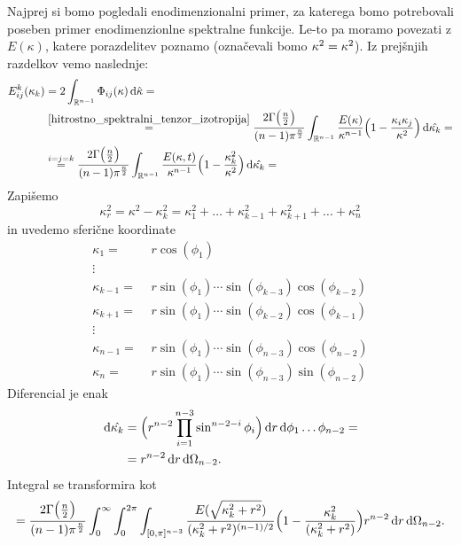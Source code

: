 \documentclass[mat2, tisk]{fmfdelo}
\newcommand{\R}{\mathbb R}
\newcommand{\bd}{\textbf}
\begin{document}
Najprej si bomo pogledali enodimenzionalni primer, za katerega bomo
potrebovali poseben primer enodimenzionlne spektralne funkcije. Le-to pa moramo 
povezati z $E(\kappa)$, katere porazdelitev poznamo (označevali bomo $\bd{\text{$\kappa$}}^2 = \kappa^2$). Iz prejšnjih razdelkov vemo 
naslednje: 
\begin{align*}
E_{ij}^k(\kappa_k) &= 2 \int_{\R^{n-1}}\Phi_{ij}(\bd{\text{$\kappa$}}) \dif \hat{\bd{\text{$\kappa$}}} = \\
&\stackrel{\ref{hitrostno_spektralni_tenzor_izotropija}}{=} \frac{2\Gamma\big(\frac{n}{2}\big)}{(n-1)\pi^\frac{n}{2}} \int_{\R^{n-1}} \frac{E(\kappa)}{\kappa^{n-1}}\Big(1 - \frac{\kappa_i \kappa_j}{\kappa^2}\Big)\dif \hat{\bd{\text{$\kappa_k$}}} = \\
&\stackrel{i=j=k}{=} \frac{2\Gamma\big(\frac{n}{2}\big)}{(n-1)\pi^\frac{n}{2}} \int_{\R^{n-1}} \frac{E(\kappa, t)}{\kappa^{n-1}}\Big(1 - \frac{\kappa_k^2}{\kappa^2}\Big)\dif \hat{\bd{\text{$\kappa_k$}}} = 
\end{align*}
Zapišemo 
$$
\kappa_r^2 = \kappa^2 - \kappa_k^2 = \kappa_1^2 + \dots + \kappa_{k-1}^2 + \kappa_{k+1}^2 + \dots + \kappa_n^2
$$
in uvedemo sferične koordinate 
\begin{align*}
\kappa_1 =& \,\,r\cos(\phi_1) \\
\vdots &\\
\kappa_{k-1} =& \,\,r\sin(\phi_{1}) \cdots \sin(\phi_{k-3}) \cos(\phi_{k-2})\\
\kappa_{k+1} =& \,\,r\sin(\phi_{1}) \cdots \sin(\phi_{k-2}) \cos(\phi_{k-1})\\
\vdots &\\
\kappa_{n-1} =& \,\,r\sin(\phi_{1}) \cdots \sin(\phi_{n-3}) \cos(\phi_{n-2})\\
\kappa_{n} =& \,\,r\sin(\phi_{1}) \cdots \sin(\phi_{n-3}) \sin(\phi_{n-2})
\end{align*}
Diferencial je enak 
\begin{align*}
\dif \hat{\bd{\text{$\kappa_k$}}} &= \Big(r^{n-2} \prod_{i=1}^{n-3} \sin^{n-2-i}{\phi_i}\Big) \dif r \dif \phi_1 \dots \phi_{n-2} = \\
&= r^{n-2} \dif r \dif \Omega_{n-2}.
\end{align*}
Integral se transformira kot
\begin{align*}
= \frac{2\Gamma\big(\frac{n}{2}\big)}{(n-1)\pi^\frac{n}{2}} \int_{0}^\infty \int_{0}^{2\pi} \int_{[0,\pi]^{n-3}}\frac{E(\sqrt{\kappa_k^2 + r^2})}{(\kappa_k^2 + r^2)^{(n-1)/2}}\Big(1 - \frac{\kappa_k^2}{(\kappa_k^2 + r^2)}\Big) r^{n-2} \dif r \dif \Omega_{n-2}.
\end{align*}
\end{document}
